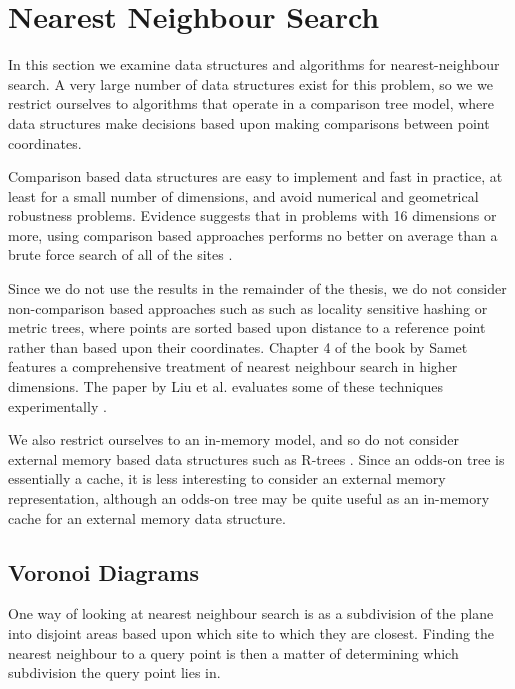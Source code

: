 \documentclass[mcs]{scsthesis}
\begin{document}
\section{Nearest Neighbour Search}


In this section we examine data structures and algorithms for nearest-neighbour
search. A very large number of data structures exist for this problem, so we
we restrict ourselves to algorithms that operate in a comparison tree
model, where data structures make decisions based upon making comparisons
between point coordinates.

Comparison based data structures are easy to implement and fast in practice, at
least for a small number of dimensions, and avoid numerical and geometrical
robustness problems. Evidence suggests that in problems with 16 dimensions or
more, using comparison based approaches performs no better on average than a
brute force search of all of the sites \cite{fastvector}.

Since we do not use the results in the remainder of the thesis, we do not
consider non-comparison based approaches such as such as locality sensitive
hashing \cite{lsh} or metric trees, where points are sorted based upon distance
to a reference point rather than based upon their coordinates. Chapter 4 of the
book by Samet \cite{samet} features a comprehensive treatment of nearest
neighbour search in higher dimensions. The paper by Liu et al. evaluates some of
these techniques experimentally \cite{practicalann}. 

We also restrict ourselves to an in-memory model, and so do not consider
external memory based data structures such as R-trees \cite{rtree}. Since an
odds-on tree is essentially a cache, it is less interesting to consider an
external memory representation, although an odds-on tree may be quite useful
as an in-memory cache for an external memory data structure.

\subsection{Voronoi Diagrams}

One way of looking at nearest neighbour search is as a subdivision of the plane
into disjoint areas based upon which site to which they are closest. Finding
the nearest neighbour to a query point is then a matter of determining which
subdivision the query point lies in.
\end{document}

